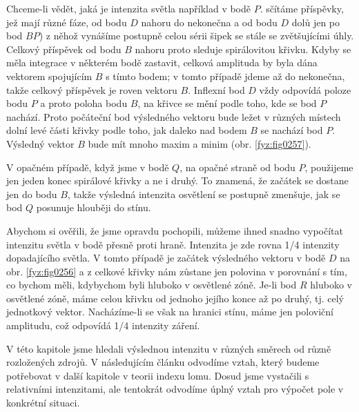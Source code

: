    Chceme-li vědět, jaká je intenzita světla například v bodě \(P\). sčítáme příspěvky, jež mají 
    různé fáze, od bodu \(D\) nahoru do nekonečna a od bodu \(D\) dolů jen po bod \(BP\)) z něhož 
    vynášíme postupně celou sérii šipek se stále se zvětšujícími úhly. Celkový příspěvek od bodu 
    \(B\) nahoru proto sleduje spirálovitou křivku. Kdyby se měla integrace v některém bodě 
    zastavit, celková amplituda by byla dána vektorem spojujícím \(B\) s tímto bodem; v tomto 
    případě jdeme až do nekonečna, takže celkový příspěvek je roven vektoru \(B\). Inflexní bod 
    \(D\) vždy odpovídá poloze bodu \(P\) a proto poloha bodu \(B\), na křivce se mění podle toho, 
    kde se bod \(P\) nachází. Proto počáteční bod výsledného vektoru bude ležet v různých místech 
    dolní levé části křivky podle toho, jak daleko nad bodem \(B\) se nachází bod \(P\). Výsledný 
    vektor \(B\) bude mít mnoho maxim a minim (obr. \ref{fyz:fig0257}).
    
    
    V opačném případě, když jsme v bodě \(Q\), na opačné straně od bodu \(P\), použijeme jen jeden 
    konec spirálové křivky a ne i druhý. To znamená, že začátek se dostane jen do bodu \(B\), takže 
    výsledná intenzita osvětlení se postupně zmenšuje, jak se bod \(Q\) posunuje hlouběji do stínu.
    
    Abychom si ověřili, že jsme opravdu pochopili, můžeme ihned snadno vypočítat intenzitu světla v 
    bodě přesně proti hraně. Intenzita je zde rovna \num{1/4} intenzity dopadajícího světla. V 
    tomto případě je začátek výsledného vektoru v bodě \(D\) na obr. \ref{fyz:fig0256} a z celkové 
    křivky nám zůstane jen polovina v porovnání s tím, co bychom měli, kdybychom byli hluboko v 
    osvětlené zóně. Je-li bod \(R\) hluboko v osvětlené zóně, máme celou křivku od jednoho jejího 
    konce až po druhý, tj. celý jednotkový vektor. Nacházíme-li se však na hranici stínu, máme jen 
    poloviční amplitudu, což odpovídá \num{1/4} intenzity záření.
    
    V této kapitole jsme hledali výslednou intenzitu v různých směrech od různě rozložených zdrojů. 
    V následujícím článku odvodíme vztah, který budeme potřebovat v další kapitole v teorii indexu 
    lomu. Dosud jsme vystačili s relativními intenzitami, ale tentokrát odvodíme úplný vztah pro 
    výpočet pole v konkrétní situaci.
    
